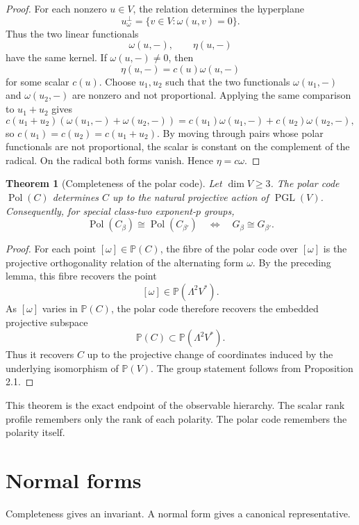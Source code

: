 \documentclass[11pt]{article}
\newtheorem{theorem}{Theorem}[section]
\begin{document}
\begin{proof}
For each nonzero $u\in V$, the relation determines the hyperplane
\[
u^\perp_\omega=\{v\in V:\omega(u,v)=0\}.
\]
Thus the two linear functionals
\[
\omega(u,-),\qquad \eta(u,-)
\]
have the same kernel. If $\omega(u,-)\ne0$, then
\[
\eta(u,-)=c(u)\omega(u,-)
\]
for some scalar $c(u)$. Choose $u_1,u_2$ such that the two functionals $\omega(u_1,-)$ and $\omega(u_2,-)$ are nonzero and not proportional. Applying the same comparison to $u_1+u_2$ gives
\[
c(u_1+u_2)(\omega(u_1,-)+\omega(u_2,-))
=
c(u_1)\omega(u_1,-)+c(u_2)\omega(u_2,-),
\]
so $c(u_1)=c(u_2)=c(u_1+u_2)$. By moving through pairs whose polar functionals are not proportional, the scalar is constant on the complement of the radical. On the radical both forms vanish. Hence $\eta=c\omega$.
\end{proof}

\begin{theorem}[Completeness of the polar code]
Let $\dim V\ge3$. The polar code $\operatorname{Pol}(C)$ determines $C$ up to the natural projective action of $\operatorname{PGL}(V)$. Consequently, for special class-two exponent-$p$ groups,
\[
\operatorname{Pol}(C_\beta)\cong \operatorname{Pol}(C_{\beta'})
\quad\Longleftrightarrow\quad
G_\beta\cong G_{\beta'}.
\]
\end{theorem}

\begin{proof}
For each point $[\omega]\in\mathbb P(C)$, the fibre of the polar code over $[\omega]$ is the projective orthogonality relation of the alternating form $\omega$. By the preceding lemma, this fibre recovers the point
\[
[\omega]\in\mathbb P(\Lambda^2V^*).
\]
As $[\omega]$ varies in $\mathbb P(C)$, the polar code therefore recovers the embedded projective subspace
\[
\mathbb P(C)\subset\mathbb P(\Lambda^2V^*).
\]
Thus it recovers $C$ up to the projective change of coordinates induced by the underlying isomorphism of $\mathbb P(V)$. The group statement follows from Proposition 2.1.
\end{proof}

This theorem is the exact endpoint of the observable hierarchy. The scalar rank profile remembers only the rank of each polarity. The polar code remembers the polarity itself.

\section{Normal forms}

Completeness gives an invariant. A normal form gives a canonical representative.
\end{document}

